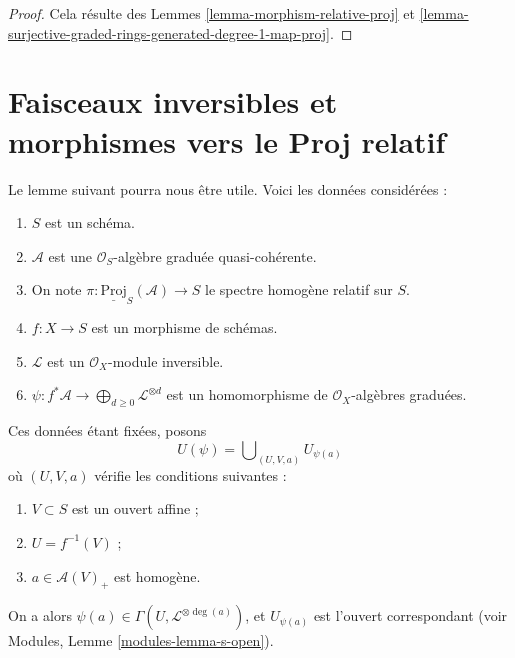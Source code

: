 \begin{proof}
Cela résulte des Lemmes
\ref{lemma-morphism-relative-proj}
et
\ref{lemma-surjective-graded-rings-generated-degree-1-map-proj}.
\end{proof}

















\section{Faisceaux inversibles et morphismes vers le Proj relatif}
\label{section-invertible-relative-proj}

\noindent
Le lemme suivant pourra nous être utile. Voici les données considérées :
\begin{enumerate}
\item $S$ est un schéma.
\item $\mathcal{A}$ est une $\mathcal{O}_S$-algèbre graduée quasi-cohérente.
\item On note
$\pi : \underline{\text{Proj}}_S(\mathcal{A}) \to S$ le spectre
homogène relatif sur $S$.
\item $f : X \to S$ est un morphisme de schémas.
\item $\mathcal{L}$ est un $\mathcal{O}_X$-module inversible.
\item $\psi : f^*\mathcal{A} \to
\bigoplus_{d \geq 0} \mathcal{L}^{\otimes d}$ est un homomorphisme de
$\mathcal{O}_X$-algèbres graduées.
\end{enumerate}
Ces données étant fixées, posons
$$
U(\psi) = \bigcup\nolimits_{(U, V, a)} U_{\psi(a)}
$$
où $(U, V, a)$ vérifie les conditions suivantes :
\begin{enumerate}
\item $V \subset S$ est un ouvert affine ;
\item $U = f^{-1}(V)$ ;
\item $a \in \mathcal{A}(V)_{+}$ est homogène.
\end{enumerate}
On a alors $\psi(a) \in \Gamma(U, \mathcal{L}^{\otimes \deg(a)})$, et
$U_{\psi(a)}$ est l'ouvert correspondant (voir Modules,
Lemme \ref{modules-lemma-s-open}).

